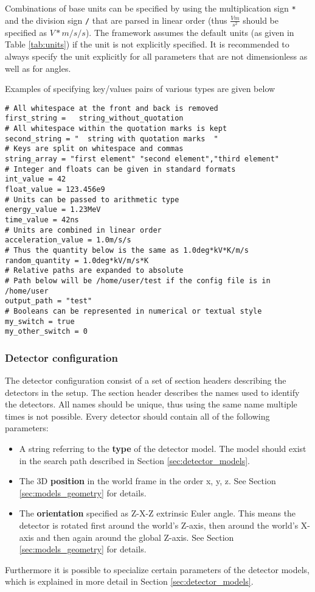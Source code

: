 Combinations of base units can be specified by using the multiplication sign \texttt{*} and the division sign \texttt{/} that are parsed in linear order (thus $\frac{V m}{s^2}$ should be specified as $V*m/s/s$). The framework assumes the default units (as given in Table \ref{tab:units}) if the unit is not explicitly specified. It is recommended to always specify the unit explicitly for all parameters that are not dimensionless as well as for angles.

Examples of specifying key/values pairs of various types are given below
\begin{verbatim}
# All whitespace at the front and back is removed
first_string =   string_without_quotation  
# All whitespace within the quotation marks is kept
second_string = "  string with quotation marks  "
# Keys are split on whitespace and commas
string_array = "first element" "second element","third element"
# Integer and floats can be given in standard formats
int_value = 42
float_value = 123.456e9
# Units can be passed to arithmetic type
energy_value = 1.23MeV
time_value = 42ns
# Units are combined in linear order
acceleration_value = 1.0m/s/s
# Thus the quantity below is the same as 1.0deg*kV*K/m/s
random_quantity = 1.0deg*kV/m/s*K 
# Relative paths are expanded to absolute 
# Path below will be /home/user/test if the config file is in /home/user
output_path = "test"
# Booleans can be represented in numerical or textual style
my_switch = true
my_other_switch = 0
\end{verbatim}

\subsubsection{Detector configuration}
\label{sec:detector_config}
The detector configuration consist of a set of section headers describing the detectors in the setup. The section header describes the names used to identify the detectors. All names should be unique, thus using the same name multiple times is not possible. Every detector should contain all of the following parameters:
\begin{itemize}
\item A string referring to the \textbf{type} of the detector model. The model should exist in the search path described in Section \ref{sec:detector_models}.
\item The 3D \textbf{position} in the world frame in the order x, y, z. See Section \ref{sec:models_geometry} for details.
\item The \textbf{orientation} specified as Z-X-Z extrinsic Euler angle. This means the detector is rotated first around the world's Z-axis, then around the world's X-axis and then again around the global Z-axis. See Section \ref{sec:models_geometry} for details.
\end{itemize}
Furthermore it is possible to specialize certain parameters of the detector models, which is explained in more detail in Section \ref{sec:detector_models}.

